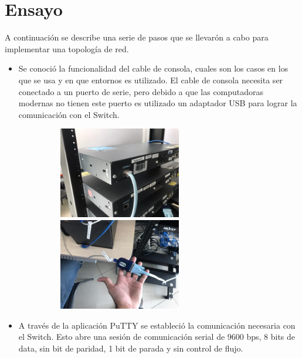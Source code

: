 \section*{Ensayo}

{
    A continuaci\'on se describe una serie de pasos que se llevar\'on a cabo para
    implementar una topolog\'ia de red.
    \renewcommand{\labelitemi}{$\diamond$}
    \begin{itemize}
        \item Se conoci\'o la funcionalidad del cable de consola, cuales son los casos en los que se usa 
        y en que entornos es utilizado. El cable de consola necesita ser conectado a un puerto de serie, pero 
        debido a que las computadoras modernas no tienen este puerto es utilizado un adaptador USB para lograr 
        la comunicaci\'on con el Switch.
        \begin{figure}[h]
            \hspace{1cm}
            \includegraphics[width=7cm, height=4cm]{imagenes/cable_consola.jpeg}
            \hspace{0.5cm}
            \includegraphics[width=7cm, height=4cm]{imagenes/cable_consola2.jpeg}
        \end{figure}

        \item A trav\'es de la aplicaci\'on PuTTY se estableci\'o la comunicaci\'on necesaria con el Switch.
        Esto abre una sesi\'on de comunicaci\'on serial de 9600 bps, 8 bits de data, sin bit de paridad, 
        1 bit de parada y sin control de flujo.
        

\end{itemize}}
